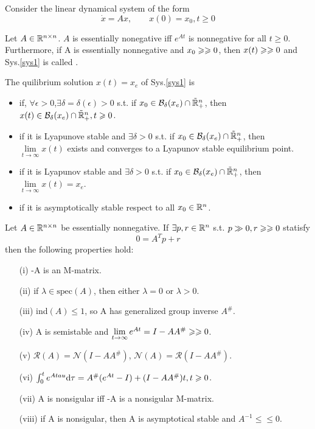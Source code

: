 \documentclass{paper}
\begin{document}
Consider the linear dynamical system of the form
\begin{equation}\label{sys1}
\dot{x}=Ax,\qquad x(0)=x_0, t\geqslant 0
\end{equation}
\begin{lem}\label{lem2}
Let $A\in \mathbb{R}^{n\times n}$. $A$ is essentially nonegative iff $e^{At}$ is nonnegative for all $t\geqslant 0$.
Furthermore, if A is essentially nonnegative and $x_0\geqslant\geqslant 0$, then $x(t)\geqslant\geqslant 0$ and Sys.\ref{sys1} is
called .
\end{lem}
\begin{defi}
The quilibrium solution $x(t)=x_e$ of Sys.\ref{sys1} is 
\begin{itemize}
\item {} if, $\forall\epsilon>0$,$\exists \delta=\delta(\epsilon)>0$ s.t. if $x_0\in 
\mathcal{B}_{\delta}(x_e) \cap \tilde{\mathbb{R}}_{+}^{n}$, then $x(t) \in \mathcal{B}_{\delta}(x_e) \cap \tilde{\mathbb{R}}_{+}^{n}, t\geqslant 0$.
\item {} if it is Lyapunove stable and $\exists \delta>0$ s.t. if $x_0\in \mathcal{B}_{\delta}(x_e) \cap \tilde{\mathbb{R}}_{+}^{n}$,
then $\lim\limits_{t\rightarrow\infty}x(t)$ exists and converges to a Lyapunov stable equilibrium point.
\item {} if it is Lyapunov stable and $\exists \delta>0$ s.t. if $x_0\in \mathcal{B}_{\delta}(x_e) \cap
\tilde{\mathbb{R}}_{+}^{n}$, then $\lim\limits_{t\rightarrow\infty}x(t)=x_e$.
\item {} if it is asymptotically stable respect to all $x_0\in\mathbb{R}^{n}$.
\end{itemize}
\end{defi}
\begin{thm}
Let $A\in \mathbb{R}^{n\times n}$ be essentially nonnegative. If $\exists p,r \in\mathbb{R}^{n}$ s.t. $p\gg 0, r\geqslant\geqslant 0$
statisfy 
\begin{equation}\label{en_cond}
0=A^Tp+r
\end{equation}
then the following properties hold:
\begin{enumerate}
\item[(i)]    -A is an M-matrix.
\item[(ii)]   if $\lambda\in\mathrm{spec}(A)$, then either $\lambda=0$ or $\lambda>0$.
\item[(iii)]  ind$(A)\leqslant 1$, so A has generalized group inverse $A^\#$.
\item[(iv)]   A is semistable and $\lim\limits_{t\rightarrow\infty}e^{At}=I-AA^{\#}\geqslant\geqslant 0$.
\item[(v)]    $\mathcal{R}(A)=\mathcal{N}(I-AA^{\#})$, $\mathcal{N}(A)=\mathcal{R}(I-AA^{\#})$.
\item[(vi)]   $\int_{0}^{t}e^{A\\tau}\mathrm{d}\tau=A^\#(e^{At}-I)+(I-AA^\#)t,t\geqslant 0$.
\item[(vii)]  A is nonsigular iff -A is a nonsigular M-matrix.
\item[(viii)] if A is nonsigular, then A is asymptotical stable and $A^{-1}\leqslant\leqslant 0$.
\end{enumerate}
\end{thm}
\end{document}
